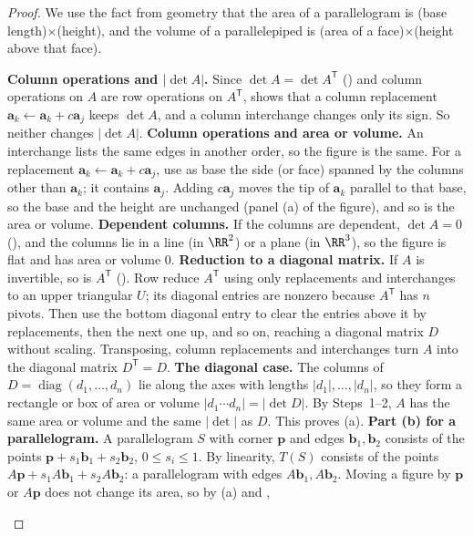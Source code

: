 \documentclass[10pt]{scrartcl}
\newcommand{\vv}[1]{\mathbf{#1}}
\begin{document}
\begin{proof}
  We use the fact from geometry that the area of a parallelogram is (base length)$\times$(height), and the volume of a parallelepiped is (area of a face)$\times$(height above that face).
  \begin{steps}
    \ii \textbf{Column operations and $|\det A|$.} Since $\det A=\det A^{\mathsf T}$ () and column operations on $A$ are row operations on $A^{\mathsf T}$,  shows that a column replacement $\vv a_k\leftarrow\vv a_k+c\vv a_j$ keeps $\det A$, and a column interchange changes only its sign. So neither changes $|\det A|$.
    \ii \textbf{Column operations and area or volume.} An interchange lists the same edges in another order, so the figure is the same. For a replacement $\vv a_k\leftarrow\vv a_k+c\vv a_j$, use as base the side (or face) spanned by the columns other than $\vv a_k$; it contains $\vv a_j$. Adding $c\vv a_j$ moves the tip of $\vv a_k$ parallel to that base, so the base and the height are unchanged (panel (a) of the figure), and so is the area or volume.
    \ii \textbf{Dependent columns.} If the columns are dependent, $\det A=0$ (), and the columns lie in a line (in $\RR^2$) or a plane (in $\RR^3$), so the figure is flat and has area or volume $0$.
    \ii \textbf{Reduction to a diagonal matrix.} If $A$ is invertible, so is $A^{\mathsf T}$ (). Row reduce $A^{\mathsf T}$ using only replacements and interchanges to an upper triangular $U$; its diagonal entries are nonzero because $A^{\mathsf T}$ has $n$ pivots. Then use the bottom diagonal entry to clear the entries above it by replacements, then the next one up, and so on, reaching a diagonal matrix $D$ without scaling. Transposing, column replacements and interchanges turn $A$ into the diagonal matrix $D^{\mathsf T}=D$.
    \ii \textbf{The diagonal case.} The columns of $D=\operatorname{diag}(d_1,\dots,d_n)$ lie along the axes with lengths $|d_1|,\dots,|d_n|$, so they form a rectangle or box of area or volume $|d_1\cdots d_n|=|\det D|$. By Steps~1--2, $A$ has the same area or volume and the same $|\det|$ as $D$. This proves (a).
    \ii \textbf{Part (b) for a parallelogram.} A parallelogram $S$ with corner $\vv p$ and edges $\vv b_1,\vv b_2$ consists of the points $\vv p+s_1\vv b_1+s_2\vv b_2$, $0\le s_i\le1$. By linearity, $T(S)$ consists of the points $A\vv p+s_1A\vv b_1+s_2A\vv b_2$: a parallelogram with edges $A\vv b_1,A\vv b_2$. Moving a figure by $\vv p$ or $A\vv p$ does not change its area, so by (a) and ,

\end{steps}
\end{proof}
\end{document}
